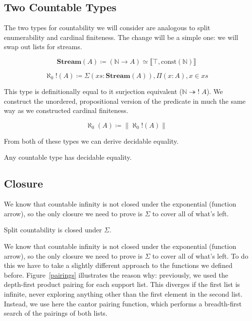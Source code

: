 \subsection{Two Countable Types}
The two types for countability we will consider are analogous to split
enumerability and cardinal finiteness.
The change will be a simple one: we will swap out lists for streams.
\begin{definition}[Streams]
  \begin{equation}
    \mathbf{Stream}(A) \coloneqq (\mathbb{N} \rightarrow A)
    \simeq \llbracket \top , \text{const}(\mathbb{N}) \rrbracket
  \end{equation}
\end{definition}
\begin{definition}
  \begin{equation}
    \aleph_0!(A) \coloneqq \Sigma {(\mathit{xs} : \mathbf{Stream}(A))} , \Pi {(x : A)} , x \in \mathit{xs}
  \end{equation}
\end{definition}
This type is definitionally equal to it surjection equivalent (\(\mathbb{N}
\twoheadrightarrow ! \; A\)).
We construct the unordered, propositional version of the predicate in much the
same way as we constructed cardinal finiteness.
\begin{definition}[Countability]
  \begin{equation}
    \aleph_0(A) \coloneqq \lVert \aleph_0!(A) \rVert
  \end{equation}
\end{definition}

From both of these types we can derive decidable equality.
\begin{lemma}
  Any countable type has decidable equality.
\end{lemma}
\subsection{Closure}
We know that countable infinity is not closed under the exponential (function
arrow), so the only closure we need to prove is \(\Sigma\) to cover all of
what's left.
\begin{theorem} \label{split-countability-sigma}
  Split countability is closed under \(\Sigma\).
\end{theorem}
We know that countable infinity is not closed under the exponential (function
arrow), so the only closure we need to prove is \(\Sigma\) to cover all of
what's left.
To do this we have to take a slightly different approach to the functions we
defined before.
Figure~\ref{pairings} illustrates the reason why: previously, we used the
depth-first product pairing for each support list.
This diverges if the first list is infinite, never exploring anything other than
the first element in the second list.
Instead, we use here the cantor pairing function, which performs a breadth-first
search of the pairings of both lists.

